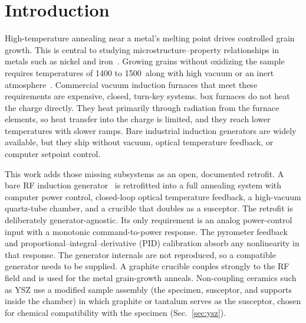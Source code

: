 \documentclass[%
 aip,
 rsi,%
 amsmath,amssymb,
 reprint,%
]{revtex4-2}
\begin{document}
\section{Introduction}

High-temperature annealing near a metal's melting point drives controlled
grain growth. This is central to studying microstructure--property
relationships in metals such as nickel and
iron~\cite{liu2021studyofgrain,mohrbacher2026applicationofmicroalloying,alogab2007theinfluenceof,tian2009experimentalandsimulation,moore2017graincoarseningbehaviour}.
Growing grains without oxidizing the sample requires temperatures of 1400 to
1500\,\celsius{} along with high vacuum or an inert
atmosphere~\cite{zhornyak1982reductionanddecarburization,muramatsu2005gascontaminationdue}.
Commercial vacuum induction furnaces that meet these requirements are
expensive, closed, turn-key systems.
box furnaces do not heat the charge directly. They heat primarily through radiation
from the furnace elements, so heat transfer into the charge is limited, and
they reach lower temperatures with slower ramps. Bare
industrial induction generators are widely available, but they ship without
vacuum, optical temperature feedback, or computer setpoint control.

This work adds those missing subsystems as an open, documented retrofit. A
bare RF induction
generator~\cite{rudnev2017handbookofinduction,lucia2014inductionheatingtechnology}
is retrofitted into a full annealing system with computer power control,
closed-loop optical temperature feedback, a high-vacuum quartz-tube chamber,
and a crucible that doubles as a susceptor. The
retrofit is deliberately generator-agnostic. Its only requirement is an analog
power-control input with a monotonic command-to-power response. The pyrometer feedback and
proportional--integral--derivative (PID) calibration absorb
any nonlinearity in that response. The generator internals are not
reproduced, so a compatible generator needs to be supplied. A graphite
crucible couples strongly to the RF field and is used for the metal
grain-growth anneals. Non-coupling ceramics such as YSZ
use a modified sample assembly (the specimen, susceptor, and supports
inside the chamber) in
which graphite or tantalum serves as the susceptor, chosen for chemical
compatibility with the specimen (Sec.~\ref{sec:ysz}).
\end{document}
